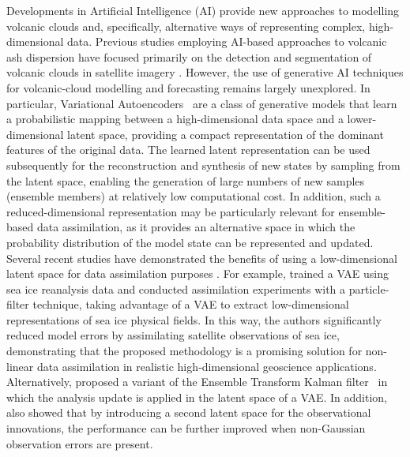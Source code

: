 %
%
Developments in Artificial Intelligence (AI) provide new approaches to modelling volcanic clouds and, specifically, alternative ways of representing complex, high-dimensional data. Previous studies employing AI-based approaches to volcanic ash dispersion have focused primarily on the detection and segmentation of volcanic clouds in satellite imagery \citep{torrisi2024,corradino2024}. However, the use of generative AI techniques for volcanic-cloud modelling and forecasting remains largely unexplored. In particular, Variational Autoencoders~\citep[VAEs;][]{kingma2013} are a class of generative models that learn a probabilistic mapping between a high-dimensional data space and a lower-dimensional latent space, providing a compact representation of the dominant features of the original data. The learned latent representation can be used subsequently for the reconstruction and synthesis of new states by sampling from the latent space, enabling the generation of large numbers of new samples (ensemble members) at relatively low computational cost. In addition, such a reduced-dimensional representation may be particularly relevant for ensemble-based data assimilation, as it provides an alternative space in which the probability distribution of the model state can be represented and updated.
%
%
Several recent studies have demonstrated the benefits of using a low-dimensional latent space for data assimilation purposes \citep{pasmans2025}. For example, \citet{chen2025} trained a VAE using sea ice reanalysis data and conducted assimilation experiments with a particle-filter technique, taking advantage of a VAE to extract low-dimensional representations of sea ice physical fields. In this way, the authors significantly reduced model errors by assimilating satellite observations of sea ice, demonstrating that the proposed methodology is a promising solution for non-linear data assimilation in realistic high‐dimensional geoscience applications.
%
Alternatively, \citet{pasmans2025} proposed a variant of the Ensemble Transform Kalman filter~\citep{bishop2001} in which the analysis update is applied in the latent space of a VAE. In addition, \citet{pasmans2025} also showed that by introducing a second latent space for the observational innovations, the performance can be further improved when non-Gaussian observation errors are present.

